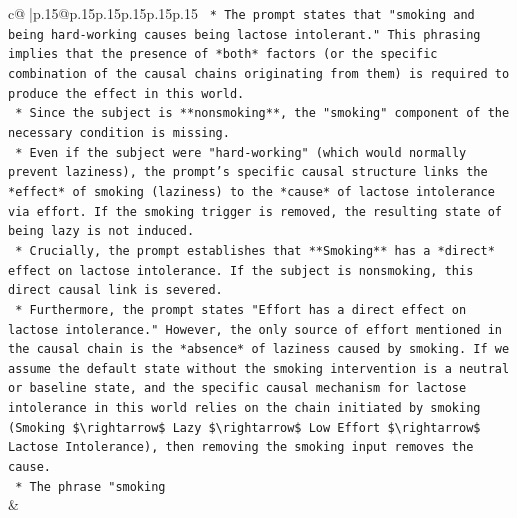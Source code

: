 \documentclass{article}
\begin{document}
{\begin{supertabular}{c@{$\;$}|p{.15\linewidth}@{}p{.15\linewidth}p{.15\linewidth}p{.15\linewidth}p{.15\linewidth}p{.15\linewidth}}
{{{\texttt{    *   The prompt states that "smoking and being hard{-}working causes being lactose intolerant." This phrasing implies that the presence of *both* factors (or the specific combination of the causal chains originating from them) is required to produce the effect in this world.} \\
\texttt{    *   Since the subject is **nonsmoking**, the "smoking" component of the necessary condition is missing.} \\
\texttt{    *   Even if the subject were "hard{-}working" (which would normally prevent laziness), the prompt's specific causal structure links the *effect* of smoking (laziness) to the *cause* of lactose intolerance via effort. If the smoking trigger is removed, the resulting state of being lazy is not induced.} \\
\texttt{    *   Crucially, the prompt establishes that **Smoking** has a *direct* effect on lactose intolerance. If the subject is nonsmoking, this direct causal link is severed.} \\
\texttt{    *   Furthermore, the prompt states "Effort has a direct effect on lactose intolerance." However, the only source of effort mentioned in the causal chain is the *absence* of laziness caused by smoking. If we assume the default state without the smoking intervention is a neutral or baseline state, and the specific causal mechanism for lactose intolerance in this world relies on the chain initiated by smoking (Smoking \$\textbackslash{}rightarrow\$ Lazy \$\textbackslash{}rightarrow\$ Low Effort \$\textbackslash{}rightarrow\$ Lactose Intolerance), then removing the smoking input removes the cause.} \\
\texttt{    *   The phrase "smoking} \\
            }
        }
    }
    & \\ \\


\end{supertabular}}
\end{document}
